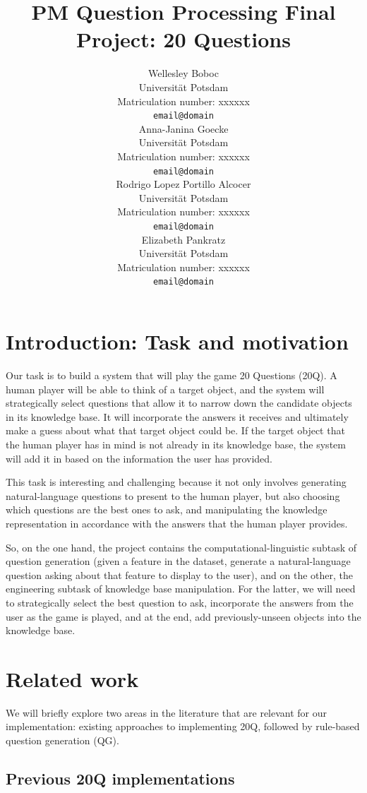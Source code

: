 \documentclass[11pt,a4paper]{article}
\title{PM Question Processing Final Project: 20 Questions}
\author{Wellesley Boboc \\
Universit{\"a}t Potsdam \\
Matriculation number: xxxxxx \\
\texttt{email@domain} \\\And
Anna-Janina Goecke \\
Universit{\"a}t Potsdam \\
Matriculation number: xxxxxx \\
\texttt{email@domain} \\\AND
Rodrigo Lopez Portillo Alcocer \\
Universit{\"a}t Potsdam \\
Matriculation number: xxxxxx \\
\texttt{email@domain} \\\And
Elizabeth Pankratz \\
Universit{\"a}t Potsdam \\
Matriculation number: xxxxxx \\
\texttt{email@domain} \\}
\date{}
\begin{document}
\maketitle

\begin{abstract}
\lipsum[1]
\end{abstract}

\section{Introduction: Task and motivation}
\label{sec:intro}

Our task is to build a system that will play the game 20 Questions (20Q).
A human player will be able to think of a target object, and the system will strategically select questions that allow it to narrow down the candidate objects in its knowledge base.
It will incorporate the answers it receives and ultimately make a guess about what that target object could be.
If the target object that the human player has in mind is not already in its knowledge base, the system will add it in based on the information the user has provided.

This task is interesting and challenging because it not only involves generating natural-language questions to present to the human player, but also choosing which questions are the best ones to ask, and manipulating the knowledge representation in accordance with the answers that the human player provides.

So, on the one hand, the project contains the computational-linguistic subtask of question generation (given a feature in the dataset, generate a natural-language question asking about that feature to display to the user), and on the other, the engineering subtask of knowledge base manipulation.
For the latter, we will need to strategically select the best question to ask, incorporate the answers from the user as the game is played, and at the end, add previously-unseen objects into the knowledge base.

\section{Related work}
\label{sec:litreview}

We will briefly explore two areas in the literature that are relevant for our implementation: existing approaches to implementing 20Q, followed by rule-based question generation (QG).

\subsection{Previous 20Q implementations}
\label{subsec:prev20q}
\end{document}

